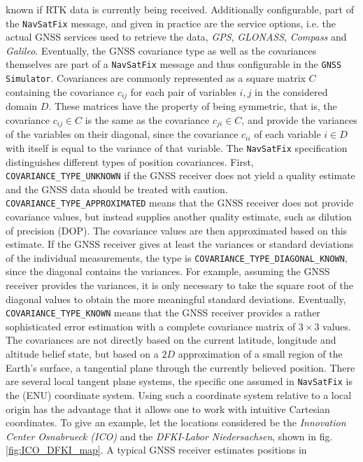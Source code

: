 \documentclass[english, master, utf8]{base/thesis_KBS}
\newcommand{\code}[1]{\colorbox{light-gray}{\texttt{#1}}}
\begin{document}
known if RTK data is currently being received.
Additionally configurable, part of the \code{NavSatFix} message, and given in practice are the service options, i.e. the actual GNSS services used to
retrieve the data, \textit{GPS}, \textit{GLONASS}, \textit{Compass} and \textit{Galileo}. Eventually, the GNSS covariance type as well as the covariances themselves are part of a
\code{NavSatFix} message and thus configurable in the \code{GNSS Simulator}. Covariances are commonly represented as a square matrix $C$ containing the covariance $c_{ij}$ for each pair
of variables $i, j$ in the considered domain $D$. These matrices have the property of being symmetric, that is, the covariance $c_{ij} \in C$ is the same as the covariance 
$c_{ji} \in C$, and provide the variances of the variables on their diagonal, since the covariance $c_{ii}$ of each variable $i \in D$ with itself is equal to the variance of
that variable. The \code{NavSatFix} specification distinguishes different
types of position covariances. First, \code{COVARIANCE\_TYPE\_UNKNOWN} if the GNSS receiver does not yield a quality estimate and the GNSS data should be treated with caution.
\code{COVARIANCE\_TYPE\_APPROXIMATED} means that the GNSS receiver does not provide covariance values, but instead supplies another quality estimate, such as dilution of precision
(DOP). The covariance values are then approximated based on this estimate. If the GNSS receiver gives at least the variances or standard deviations of the individual measurements,
the type is \code{COVARIANCE\_TYPE\_DIAGONAL\_KNOWN}, since the diagonal contains the variances. For example, assuming the GNSS receiver provides the variances, it is only necessary
to take the square root of the diagonal values to obtain the more meaningful standard deviations. Eventually, \code{COVARIANCE\_TYPE\_KNOWN} means that the GNSS receiver provides
a rather sophisticated error estimation with a complete covariance matrix of $3 \times 3$ values. The covariances are not directly based on the
current latitude, longitude and altitude belief state, but based on a $2D$ approximation of a small region of the Earth's surface, a tangential plane through the currently believed
position. There are several local tangent plane systems, the specific one assumed in \code{NavSatFix} is the  (ENU) coordinate system. Using such a coordinate
system relative to a local origin has the advantage that it allows one to work with intuitive Cartesian coordinates. To give an example, let the locations considered be the 
\textit{Innovation Center Osnabrueck (ICO)} and the \textit{DFKI-Labor Niedersachsen}, shown in fig. \ref{fig:ICO_DFKI_map}. A typical GNSS receiver estimates positions in
\end{document}
